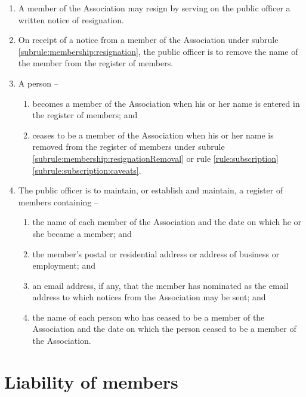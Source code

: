 \documentclass[a4paper,11pt]{article}
\begin{document}
\begin{enumerate}
	\item \label{subrule:membership:resignation} A member of the Association may resign by serving on the public officer a written notice of resignation.
	\item \label{subrule:membership:resignationRemoval} On receipt of a notice from a member of the Association under subrule \ref{subrule:membership:resignation}, the public officer is to remove the name of the member from the register of members.

	\item A person --
	\begin{enumerate}
		\item becomes a member of the Association when his or her name is entered in the register of members; and
		\item ceases to be a member of the Association when his or her name is removed from the register of members under subrule \ref{subrule:membership:resignationRemoval} or rule \ref{rule:subscription}\ref{subrule:subscription:caveats}.
	\end{enumerate}
	
	\item \label{subrule:membership:registry} The public officer is to maintain, or establish and maintain, a register of members containing --
	\begin{enumerate}
		\item the name of each member of the Association and the date on which he or she became a member; and
		\item the member's postal or residential address or address of business or employment; and
		\item an email address, if any, that the member has nominated as the email address to which notices from the Association may be sent; and
		\item the name of each person who has ceased to be a member of the Association and the date on which the person ceased to be a member of the Association.
	\end{enumerate}
	
\end{enumerate}

\section{Liability of members}
\label{rule:liability}
\end{document}
